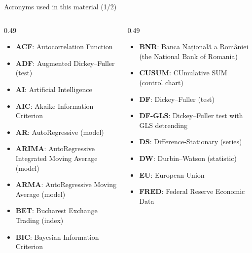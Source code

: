 {
\begin{frame}[noframenumbering]
    \titlepage
\end{frame}
}
\begin{frame}{Acronyms used in this material (1/2)}
\begin{columns}[T]
\begin{column}{0.49\textwidth}
\begin{itemize}\setlength{\itemsep}{0pt}
    \item \textbf{ACF}: Autocorrelation Function
    \item \textbf{ADF}: Augmented Dickey–Fuller (test)
    \item \textbf{AI}: Artificial Intelligence
    \item \textbf{AIC}: Akaike Information Criterion
    \item \textbf{AR}: AutoRegressive (model)
    \item \textbf{ARIMA}: AutoRegressive Integrated Moving Average (model)
    \item \textbf{ARMA}: AutoRegressive Moving Average (model)
    \item \textbf{BET}: Bucharest Exchange Trading (index)
    \item \textbf{BIC}: Bayesian Information Criterion
\end{itemize}
\end{column}
\begin{column}{0.49\textwidth}
\begin{itemize}\setlength{\itemsep}{0pt}
    \item \textbf{BNR}: Banca Națională a României (the National Bank of Romania)
    \item \textbf{CUSUM}: CUmulative SUM (control chart)
    \item \textbf{DF}: Dickey–Fuller (test)
    \item \textbf{DF-GLS}: Dickey–Fuller test with GLS detrending
    \item \textbf{DS}: Difference-Stationary (series)
    \item \textbf{DW}: Durbin–Watson (statistic)
    \item \textbf{EU}: European Union
    \item \textbf{FRED}: Federal Reserve Economic Data
\end{itemize}
\end{column}
\end{columns}
\end{frame}
